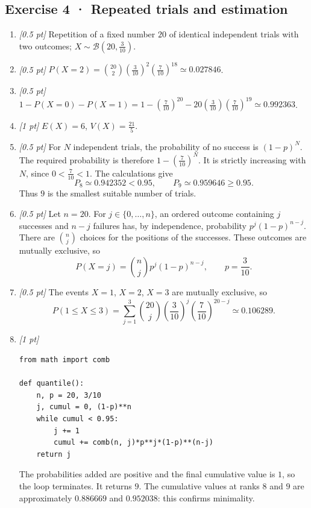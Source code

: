 \subsection*{Exercise 4 · Repeated trials and estimation}\begin{enumerate}

\item \textit{[0.5 pt]} Repetition of a fixed number $20$ of identical independent trials with two outcomes; $X\sim\mathcal B(20,\frac{3}{10})$.

\item \textit{[0.5 pt]} $P(X=2)=\binom{20}2(\frac{3}{10})^2(\frac{7}{10})^{18}\simeq\num{0,027846}$.

\item \textit{[0.5 pt]} $1-P(X=0)-P(X=1)=1-(\frac{7}{10})^{20}-20(\frac{3}{10})(\frac{7}{10})^{19}\simeq\num{0,992363}$.

\item \textit{[1 pt]} $E(X)=6$, $V(X)=\frac{21}{5}$.

\item \textit{[0.5 pt]} For $N$ independent trials, the probability of no success is $(1-p)^N$. The required probability is therefore $1-(\frac{7}{10})^N$. It is strictly increasing with $N$, since $0<\frac{7}{10}<1$. The calculations give
\[P_{8}\simeq\num{0,942352}<\num{0,95},\qquad P_{9}\simeq\num{0,959646}\ge\num{0,95}.\]
Thus $9$ is the smallest suitable number of trials.

\item \textit{[0.5 pt]} Let $n=20$. For $j\in\{0,\ldots,n\}$, an ordered outcome containing $j$ successes and $n-j$ failures has, by independence, probability $p^j(1-p)^{n-j}$. There are $\binom nj$ choices for the positions of the successes. These outcomes are mutually exclusive, so
\[P(X=j)=\binom nj p^j(1-p)^{n-j},\qquad p=\frac{3}{10}.\]

\item \textit{[0.5 pt]} The events $X=1$, $X=2$, $X=3$ are mutually exclusive, so
\[P(1\le X\le3)=\sum_{j=1}^3\binom{20}j(\frac{3}{10})^j(\frac{7}{10})^{20-j}\simeq\num{0,106289}.\]


\item \textit{[1 pt]} 
\begin{lstlisting}
from math import comb

def quantile():
    n, p = 20, 3/10
    j, cumul = 0, (1-p)**n
    while cumul < 0.95:
        j += 1
        cumul += comb(n, j)*p**j*(1-p)**(n-j)
    return j
\end{lstlisting}
The probabilities added are positive and the final cumulative value is $1$, so the loop terminates. It returns $9$. The cumulative values at ranks $8$ and $9$ are approximately $\num{0,886669}$ and $\num{0,952038}$: this confirms minimality.

\end{enumerate}

